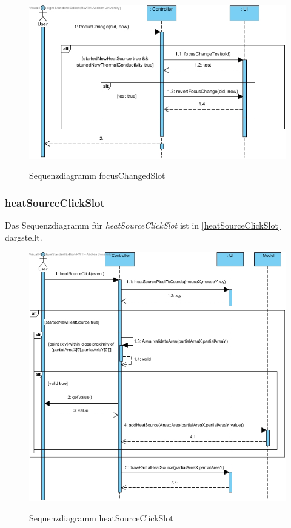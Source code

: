 \begin{figure}[H]
	\centering
	\includegraphics[scale=.6]{Bilder/Controller__focusChangeSlot().jpg}\\
	\caption{Sequenzdiagramm focusChangedSlot}
	\label{Sequenzdiagramm focusChangedSlot}
\end{figure}

\subsubsection*{heatSourceClickSlot}

Das Sequenzdiagramm für \emph{heatSourceClickSlot} ist in \ref{heatSourceClickSlot} dargstellt.

\begin{figure}[H]
	\centering
	\includegraphics[scale=.6]{Bilder/Controller__heatSourceClickSlot().jpg}\\
	\caption{Sequenzdiagramm heatSourceClickSlot}
	\label{Sequenzdiagramm heatSourceClickSlot}
\end{figure}

